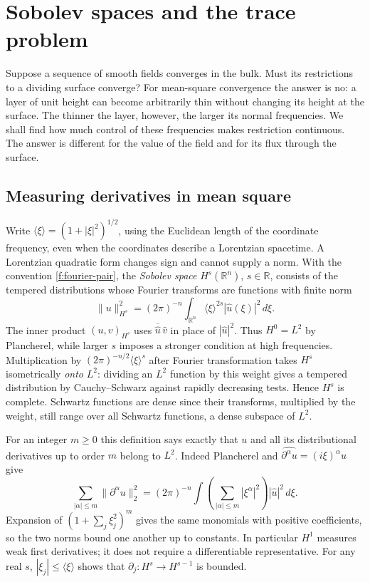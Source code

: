 \chapter{Sobolev spaces and the trace problem}\label{f:traces}

Suppose a sequence of smooth fields converges in the bulk. Must its restrictions to a dividing surface converge? For mean-square convergence the answer is no: a layer of unit height can become arbitrarily thin without changing its height at the surface. The thinner the layer, however, the larger its normal frequencies. We shall find how much control of these frequencies makes restriction continuous. The answer is different for the value of the field and for its flux through the surface.

\section{Measuring derivatives in mean square}\label{f:sobolev-scale}

Write $\langle\xi\rangle=(1+|\xi|^2)^{1/2}$, using the Euclidean length of the coordinate frequency, even when the coordinates describe a Lorentzian spacetime. A Lorentzian quadratic form changes sign and cannot supply a norm. With the convention \eqref{f:fourier-pair}, the \emph{Sobolev space} $H^s(\mathbb R^n)$, $s\in\mathbb R$, consists of the tempered distributions whose Fourier transforms are functions with finite norm
\begin{equation}
 \|u\|_{H^s}^2=(2\pi)^{-n}\int_{\mathbb R^n}\langle\xi\rangle^{2s}|\widehat u(\xi)|^2\,d\xi .\label{f:sobolev-norm}
\end{equation}
The inner product $(u,v)_{H^s}$ uses $\overline{\widehat u}\,\widehat v$ in place of $|\widehat u|^2$. Thus $H^0=L^2$ by Plancherel, while larger $s$ imposes a stronger condition at high frequencies. Multiplication by $(2\pi)^{-n/2}\langle\xi\rangle^s$ after Fourier transformation takes $H^s$ isometrically \emph{onto} $L^2$: dividing an $L^2$ function by this weight gives a tempered distribution by Cauchy--Schwarz against rapidly decreasing tests. Hence $H^s$ is complete. Schwartz functions are dense since their transforms, multiplied by the weight, still range over all Schwartz functions, a dense subspace of $L^2$.

For an integer $m\geq0$ this definition says exactly that $u$ and all its distributional derivatives up to order $m$ belong to $L^2$. Indeed Plancherel and $\widehat{\partial^\alpha u}=(i\xi)^\alpha\widehat u$ give
\[
 \sum_{|\alpha|\leq m}\|\partial^\alpha u\|_2^2
  =(2\pi)^{-n}\int\!\left(\sum_{|\alpha|\leq m}|\xi^\alpha|^2\right)|\widehat u|^2\,d\xi .
\]
Expansion of $(1+\sum_j\xi_j^2)^m$ gives the same monomials with positive coefficients, so the two norms bound one another up to constants. In particular $H^1$ measures weak first derivatives; it does not require a differentiable representative. For any real $s$, $|\xi_j|\leq\langle\xi\rangle$ shows that $\partial_j:H^s\to H^{s-1}$ is bounded.


